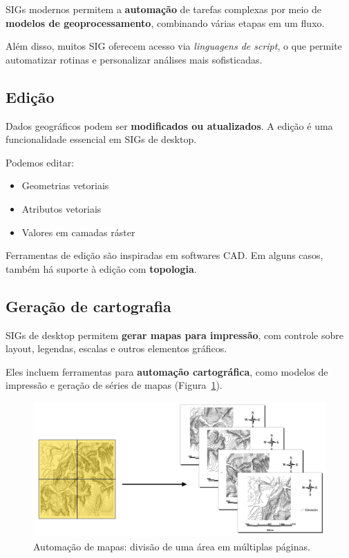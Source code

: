 SIGs modernos permitem a \textbf{automação} de tarefas complexas por meio de \textbf{modelos de geoprocessamento}, combinando várias etapas em um fluxo.

Além disso, muitos SIG oferecem acesso via \emph{linguagens de script}, o que permite automatizar rotinas e personalizar análises mais sofisticadas.

\subsection{Edição}

Dados geográficos podem ser \textbf{modificados ou atualizados}. A edição é uma funcionalidade essencial em SIGs de desktop.

Podemos editar:

\begin{itemize}
 \item Geometrias vetoriais
 \item Atributos vetoriais
 \item Valores em camadas ráster
\end{itemize}

Ferramentas de edição são inspiradas em softwares CAD. Em alguns casos, também há suporte à edição com \textbf{topologia}.

\subsection{Geração de cartografia}

SIGs de desktop permitem \textbf{gerar mapas para impressão}, com controle sobre layout, legendas, escalas e outros elementos gráficos.

Eles incluem ferramentas para \textbf{automação cartográfica}, como modelos de impressão e geração de séries de mapas (Figura~\ref{Fig:Serie_mapas}).

\begin{figure}[!hbt]
\centering
\includegraphics[width=\textwidth]{Software/Serie_mapas.png}
\caption{\small Automação de mapas: divisão de uma área em múltiplas páginas.}
\label{Fig:Serie_mapas} 
\end{figure}

